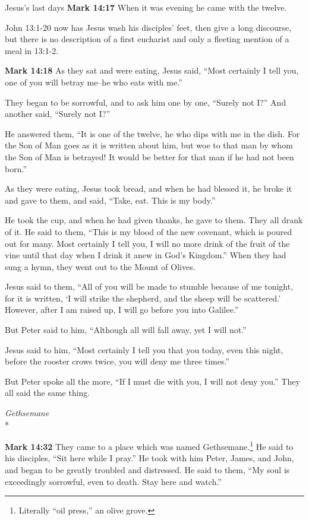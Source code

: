 \documentclass[10pt,twoside]{article} %
\newcommand{\quotesize}{\normalsize{}}
\newcommand{\comm}[1]{\begingroup \color{black!50} #1\endgroup}
\newenvironment{quotetext}{\begingroup\quotesize}{\endgroup}
\newcommand{\intex}[1]{\index[texts]{#1}}
\newcommand{\bible}[2]{\begin{quotetext}\textbf{#1}\intex{#1} #2\end{quotetext}}
\newcommand{\gospelmark}[2]{\bible{Mark #1}{#2}}
\newcommand{\subhead}[1]{\emph{#1}\\*}
\begin{document}
\begin{section}{Jesus's last days}
\gospelmark{14:17}{
When it was evening he came with the twelve.}

\comm{John 13:1-20 now has Jesus wash his disciples' feet, then give a long discourse, but there is no description of
a first eucharist and only a fleeting mention of a meal in 13:1-2.}

\gospelmark{14:18}{
     As they sat and were eating, Jesus said, ``Most certainly I tell you, one of you will betray me--he who eats with me.''

  They began to be sorrowful, and to ask him one by one, ``Surely not I?'' And another said, ``Surely not I?''

  He answered them, ``It is one of the twelve, he who dips with me in the dish.    For the Son of Man goes as it is written about him, but woe to that man by whom the Son of Man is betrayed! It would be better for that man if he had not been born.''

  As they were eating, Jesus took bread, and when he had blessed it, he broke it and gave to them, and said, ``Take, eat. This is my body.''

  He took the cup, and when he had given thanks, he gave to them. They all drank of it.   He said to them, ``This is my blood of the new covenant, which is poured out for many.    Most certainly I tell you, I will no more drink of the fruit of the vine until that day when I drink it anew in God's Kingdom.''   When they had sung a hymn, they went out to the Mount of Olives.

  Jesus said to them, ``All of you will be made to stumble because of me tonight, for it is written, `I will strike the shepherd, and the sheep will be scattered.'    However, after I am raised up, I will go before you into Galilee.''

  But Peter said to him, ``Although all will fall away, yet I will not.''

  Jesus said to him, ``Most certainly I tell you that you today, even this night, before the rooster crows twice, you will deny me three times.''

  But Peter spoke all the more, ``If I must die with you, I will not deny you.'' They all said the same thing.
}

\subhead{Gethsemane}

\gospelmark{14:32}{
  They came to a place which was named Gethsemane.\footnote{Literally ``oil press,'' an olive grove.}
He said to his disciples, ``Sit here while I pray.''   He took with him Peter, James, and John, and began to be greatly troubled and distressed.   He said to them, ``My soul is exceedingly sorrowful, even to death. Stay here and watch.''

}
\end{section}
\end{document}
